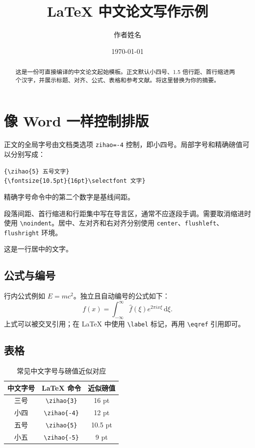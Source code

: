 \documentclass[UTF8,zihao=-4,fontset=windows]{ctexart}
\title{LaTeX 中文论文写作示例}
\author{作者姓名}
\date{\today}
\begin{document}
\maketitle

\begin{abstract}
这是一份可直接编译的中文论文起始模板。正文默认小四号、1.5 倍行距、首行缩进两个汉字，并展示标题、对齐、公式、表格和参考文献。将这里替换为你的摘要。
\end{abstract}

\section{像 Word 一样控制排版}

正文的全局字号由文档类选项 \verb|zihao=-4| 控制，即小四号。局部字号和精确磅值可以分别写成：
\begin{flushleft}
  \verb|{\zihao{5} 五号文字}|\\
  \verb|{\fontsize{10.5pt}{16pt}\selectfont 文字}|
\end{flushleft}
精确字号命令中的第二个数字是基线间距。

段落间距、首行缩进和行距集中写在导言区，通常不应逐段手调。需要取消缩进时使用
\verb|\noindent|。居中、左对齐和右对齐分别使用 \verb|center|、\verb|flushleft|、
\verb|flushright| 环境。

\begin{center}
  这是一行居中的文字。
\end{center}

\subsection{公式与编号}

行内公式例如 $E=mc^2$。独立且自动编号的公式如下：
\begin{equation}
  f(x)=\int_{-\infty}^{\infty}\hat f(\xi)e^{2\pi i x\xi}\,\mathrm{d}\xi.
  \label{eq:fourier}
\end{equation}
上式可以被交叉引用；在 LaTeX 中使用 \verb|\label| 标记，再用 \verb|\eqref| 引用即可。

\subsection{表格}

\begin{table}[htbp]
  \centering
  \caption{常见中文字号与磅值近似对应}
  \label{tab:font-size}
  \begin{tabular}{ccc}
    \toprule
    中文字号 & LaTeX 命令 & 近似磅值 \\
    \midrule
    三号 & \verb|\zihao{3}| & 16 pt \\
    小四 & \verb|\zihao{-4}| & 12 pt \\
    五号 & \verb|\zihao{5}| & 10.5 pt \\
    小五 & \verb|\zihao{-5}| & 9 pt \\
    \bottomrule
  \end{tabular}
\end{table}
\end{document}
